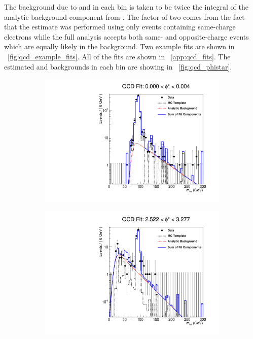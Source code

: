 The background due to \QCDjets and \wjets in each \phistar bin is taken to be
twice the integral of the analytic background component from \MassRange. The
factor of two comes from the fact that the estimate was performed using only
events containing same-charge electrons while the full analysis accepts both
same- and opposite-charge events which are equally likely in the background.
Two example fits are shown in \FIG~\ref{fig:qcd_example_fits}. All of the fits
are shown in \APP~\ref{app:qcd_fits}. The estimated \QCDjets and \wjets
backgrounds in each \phistar bin are showing in \FIG~\ref{fig:qcd_phistar}.

\begin{figure}[!htbp]
    \centering
    \begin{subfigure}[b]{\SideBySidePlotWidth}
        \includegraphics[width=\linewidth]{figures/qcd_fits/qcd_fit_plot_for_01.pdf}
        \caption{}
        \label{fig:qcd_fit_example_01}
    \end{subfigure}%
    \begin{subfigure}[b]{\SideBySidePlotWidth}
        \includegraphics[width=\linewidth]{figures/qcd_fits/qcd_fit_plot_for_34.pdf}

\end{subfigure}
\end{figure}
